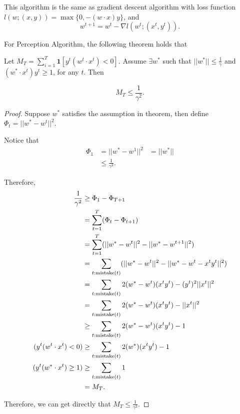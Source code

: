 \documentclass[../main.tex]{subfiles}
\begin{document}
This algorithm is the same as gradient descent algorithm with loss function $l(w;(x,y)) = \max\{0, -(w\cdot x)y\} $, and
\begin{equation*}
	w^{t+1} = w^t - \nabla l(w^t;(x^t,y^t)).
\end{equation*}

For Perception Algorithm, the following theorem holds that 

\begin{theorem}
	Let $M_T = \sum\limits_{i=1}^T \mathbf{1}[y^t(w^t\cdot x^t) < 0]$. Assume $\exists w^*$ such that $||w^*||\leq \frac{1}{\gamma}$ and $(w^*\cdot x^t) y^t \geq 1$, for any $t$. Then
	
	\begin{equation}
	M_T \leq \frac{1}{\gamma^2}.
	\end{equation}
\end{theorem}

\begin{proof}
	Suppose $w^*$ satisfies the assumption in theorem, then define $\Phi_{t} = ||w^* - w^t||^2$.
	
	Notice that 
	\begin{equation*}
		\begin{aligned}
			\Phi_{1} &= ||w^* - w^1||^2
					 & = ||w^*|| \\
					 &\leq \frac{1}{\gamma^2}.
		\end{aligned}
	\end{equation*}
	
	Therefore, 
	\begin{equation*}
	\begin{aligned}
	\frac{1}{\gamma^2} &\geq \Phi_{1} - \Phi_{T+1} \\
	& = \sum\limits_{t = 1}^T ( \Phi_{t} - \Phi_{t+1}) \\
	& = \sum\limits_{t = 1}^T ( ||w^* - w^t||^2 -||w^* - w^{t+1}||^2) \\
	& =  \sum\limits_{t:\textmd{mistake}(t)} ( ||w^* - w^t||^2 -||w^* - w^t - x^ty^t||^2) \\
	& =  \sum\limits_{t:\textmd{mistake}(t)} 2(w^* - w^t)(x^ty^t) -(y^t)^2||x^t||^2 \\
	& =  \sum\limits_{t:\textmd{mistake}(t)} 2(w^* - w^t)(x^ty^t) -||x^t||^2 \\
	& \geq \sum\limits_{t:\textmd{mistake}(t)} 2(w^* - w^t)(x^ty^t) - 1\\
	(y^t(w^t\cdot x^t) < 0)& \geq \sum\limits_{t:\textmd{mistake}(t)} 2(w^*)(x^ty^t) - 1 \\
	(y^t(w^*\cdot x^t) \geq 1)& \geq \sum\limits_{t:\textmd{mistake}(t)} 1\\ 
	& = M_T.
	\end{aligned}
	\end{equation*}
	
	Therefore, we can get directly that $M_T \leq \frac{1}{\gamma^2}$.
\end{proof}
\end{document}
